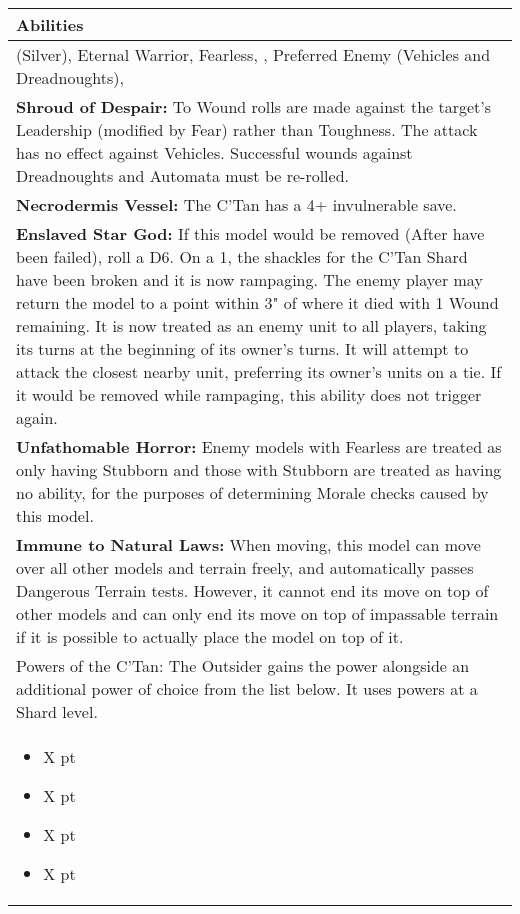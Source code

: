 \noindent
\begin{tabular}{||m{532pt}||}
	\hline
	Abilities \\
	\hline
	\quickref{Awakening Protocols} (Silver), Eternal Warrior, Fearless, \quickref{Living Metal}, Preferred Enemy (Vehicles and Dreadnoughts), \quickref{Reanimation Protocols} \\
	\textbf{Shroud of Despair:} To Wound rolls are made against the target's Leadership (modified by Fear) rather than Toughness. The attack has no effect against Vehicles. Successful wounds against Dreadnoughts and Automata must be re-rolled. \\
	\textbf{Necrodermis Vessel:} The C'Tan has a 4+ invulnerable save. \\
	\textbf{Enslaved Star God:} If this model would be removed (After \quickref{Reanimation Protocols} have been failed), roll a D6. On a 1, the shackles for the C'Tan Shard have been broken and it is now rampaging. The enemy player may return the model to a point within 3" of where it died with 1 Wound remaining. It is now treated as an enemy unit to all players, taking its turns at the beginning of its owner's turns. It will attempt to attack the closest nearby unit, preferring its owner's units on a tie. If it would be removed while rampaging, this ability does not trigger again. \\
	\textbf{Unfathomable Horror:} Enemy models with Fearless are treated as only having Stubborn and those with Stubborn are treated as having no ability, for the purposes of determining Morale checks caused by this model. \\
	\textbf{Immune to Natural Laws:} When moving, this model can move over all other models and terrain 	freely, and automatically passes Dangerous Terrain tests. However, it cannot end its move on top of other models and can only end its move on top of impassable terrain if it is possible to actually place the model on top of it. \\
	Powers of the C'Tan: The Outsider gains the \quickref{Gaze of the Abyss} power alongside an additional power of choice from the list below. It uses powers at a Shard level. \\
	\begin{itemize}
		\item \quickref{Antimatter Meteor} \hrulefill X pt
		\item \quickref{Cosmic Fire} \hrulefill X pt
		\item \quickref{Entropic Touch} \hrulefill X pt
		\item \quickref{Moulder of Worlds} \hrulefill X pt

\end{itemize}
\end{tabular}
